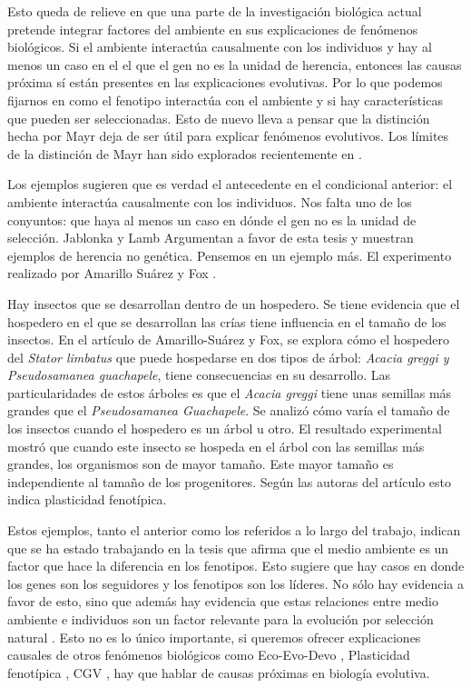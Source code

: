 Esto queda de relieve en que una parte de la investigación biológica actual pretende integrar factores del ambiente en sus explicaciones de fenómenos biológicos. Si el ambiente interactúa causalmente con los individuos y hay al menos un caso en el el que el gen no es la unidad de herencia, entonces las causas próxima sí están presentes en las explicaciones evolutivas. Por lo que podemos fijarnos en como el fenotipo interactúa con el ambiente y si hay características que pueden ser seleccionadas. Esto de nuevo lleva a pensar que la distinción hecha por Mayr deja de ser útil para explicar fenómenos evolutivos. Los límites de la distinción de Mayr han sido explorados recientemente en \cite{Uller2020, Dayan2020, Laland2011}.

Los ejemplos sugieren que es verdad el antecedente en el condicional anterior: el ambiente interactúa causalmente con los individuos. Nos falta uno de los conyuntos: que haya al menos un caso en dónde el gen no es la unidad de selección. Jablonka y Lamb Argumentan a favor de esta tesis y muestran ejemplos de herencia no genética. Pensemos en un ejemplo más. El experimento realizado por Amarillo Suárez y Fox \citeyear{Amarillo-Suarez2006}.

Hay insectos que se desarrollan dentro de un hospedero. Se tiene evidencia que el hospedero en el que se desarrollan las crías tiene influencia en el tamaño de los insectos. En el artículo de Amarillo-Suárez y Fox, se explora cómo el hospedero del \emph{Stator limbatus} que puede hospedarse en dos tipos de árbol: \emph{Acacia greggi y Pseudosamanea guachapele}, tiene consecuencias en su desarrollo. Las particularidades de estos árboles es que el \emph{Acacia greggi} tiene unas semillas más grandes que el \emph{Pseudosamanea Guachapele}. Se analizó cómo varía el tamaño de los insectos cuando el hospedero es un árbol u otro. El resultado experimental mostró que cuando este insecto se hospeda en el árbol con las semillas más grandes, los organismos son de mayor tamaño. Este mayor tamaño es independiente al tamaño de los progenitores. Según las autoras del artículo esto indica plasticidad fenotípica.

Estos ejemplos, tanto el anterior como los referidos a lo largo del trabajo, indican que se ha estado trabajando en la tesis que afirma que el medio ambiente es un factor que hace la diferencia en los fenotipos. Esto sugiere que hay casos en donde los genes son los seguidores y los fenotipos son los líderes. No sólo hay evidencia a favor de esto, sino que además hay evidencia que estas relaciones entre medio ambiente e individuos son un factor relevante para la evolución por selección natural \cite{Jablonka2020, Dayan2020, MacColl2011}. Esto no es lo único importante, si queremos ofrecer explicaciones causales de otros fenómenos biológicos como Eco-Evo-Devo \cite{PfenningEco-Evo-Devo}, Plasticidad fenotípica \cite{WESTEBERHARD20082701}, CGV \cite{CVG}, hay que hablar de causas próximas en biología evolutiva.


